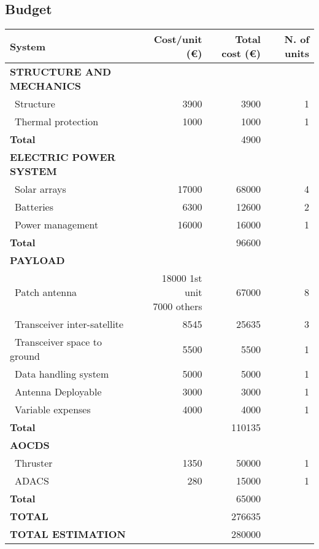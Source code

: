
\subsection{Budget}

\begin{longtable}{| l | r | r | r |}
\rowcolor[gray]{0.80}	\textbf{System} & \textbf{Cost/unit (\euro)} & \textbf{Total cost (\euro)} & \textbf{N. of units}\\
    \hline
    \endfirsthead


\rowcolor[gray]{0.85} \textbf{STRUCTURE AND MECHANICS} & & & \\
   ~Structure & 3900 & 3900 & 1 \\
   ~Thermal protection & 1000  & 1000 & 1\\
   \hline
   \rowcolor[gray]{0.95} \textbf{Total} &  & 4900 &  \\
   \hline
   
\rowcolor[gray]{0.85} \textbf{ELECTRIC POWER SYSTEM} & & & \\
   ~Solar arrays & 17000 & 68000 & 4 \\
   ~Batteries & 6300 & 12600 & 2 \\
   ~Power management & 16000 & 16000 & 1 \\
   \hline
   \rowcolor[gray]{0.95} \textbf{Total} & & 96600 &  \\
   \hline

\rowcolor[gray]{0.85} \textbf{PAYLOAD} & & & \\

   ~Patch antenna & \makecell{18000 1st unit \\ 7000 others} & 67000 & 8 \\
   ~Transceiver inter-satellite & 8545 & 25635 & 3 \\
   ~Transceiver space to ground & 5500  & 5500 & 1 \\
   ~Data handling system & 5000 & 5000 & 1\\
   ~Antenna Deployable & 3000 & 3000 & 1\\
   ~Variable expenses & 4000 & 4000 & 1\\
   \hline
   \rowcolor[gray]{0.95} \textbf{Total} & & 110135 & \\
   \hline
   
\rowcolor[gray]{0.85} \textbf{AOCDS} & & &\\

   ~Thruster & 1350 & 50000 & 1 \\
   ~ADACS & 280 & 15000 & 1 \\
   \hline
   \rowcolor[gray]{0.95} \textbf{Total} & & 65000 & \\
   \hline

\rowcolor[gray]{0.9} \textbf{TOTAL} & & 276635 & \\
\hline
\rowcolor[gray]{0.9} \textbf{TOTAL ESTIMATION} & & 280000 & \\
\hline

\end{longtable} 
